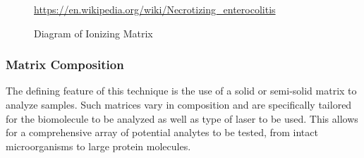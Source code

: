 \documentclass[letterpaper, 10 pt, conference]{ieeeconf}  %
\begin{document}
            \begin{figure}[h]
                \centering
            
                \caption{Diagram of Ionizing Matrix}

                \tiny{\url{https://en.wikipedia.org/wiki/Necrotizing_enterocolitis}}

            \end{figure}

            \subsubsection[\textbf{Matrix Composition}]{\textbf{Matrix Composition}\autocite{R1,R5}} \hfill \hfill

            The defining feature of this technique is the use of a solid or semi-solid matrix to analyze samples. Such matrices vary in composition and are specifically tailored for the biomolecule to be analyzed as well as type of laser to be used. This allows for a comprehensive array of potential analytes to be tested, from intact microorganisms to large protein molecules.
\end{document}
